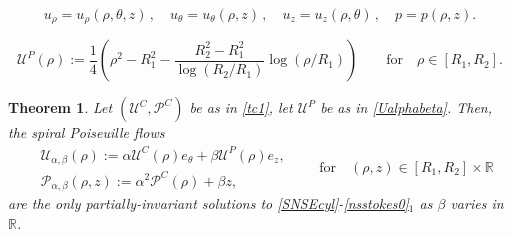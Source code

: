 \documentclass[10pt,a4paper]{amsart}
\newtheorem{theorem}{Theorem}
\def\P{{\mathcal P}}
\def\U{{\mathcal U}}
\begin{document}
	\begin{equation}\label{assumption}
		u_\rho=u_\rho(\rho,\theta,z)\, ,\quad u_\theta=u_\theta(\rho,z)\, ,\quad u_z=u_z(\rho,\theta)\, ,\quad p=p(\rho,z).
	\end{equation}

    \begin{equation}\label{Ualphabeta}
        \U^P(\rho):=
        \frac{1}{4} \left(\rho^2-R_1^2 - \frac{R_2^2-R_1^2}{\log (R_2/R_1)}\log(\rho/R_1) \right)\qquad \text{for} \quad \rho\in [R_1,R_2].
    \end{equation}

	\begin{theorem}\label{theo-tcg}
		Let $({\U^C},{\P^C})$ be as in \eqref{tc1}, let $\U^P$ be as in \eqref{Ualphabeta}. Then, the spiral Poiseuille flows 
		\begin{equation} \label{tcg}\begin{aligned}
				&\U_{\alpha,\beta}(\rho) := \alpha\U^C(\rho)e_\theta+ \beta\U^P(\rho)e_z,\\[5pt]
				& \P_{\alpha,\beta}(\rho, z) := \alpha^2\P^C(\rho)+ \beta z,\end{aligned}  \qquad \text{for} \quad (\rho,z) \in[R_1,R_2]\times \mathbb{R}\,
		\end{equation}
		are the only partially-invariant solutions  to \eqref{SNSEcyl}-\eqref{nsstokes0}$_1$ as $ \beta$ varies in $\mathbb{R}$.
		\end{theorem}
\end{document}
